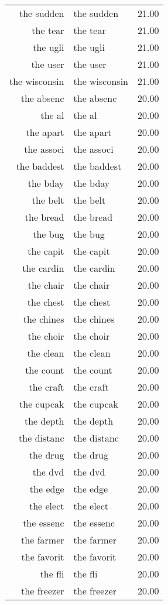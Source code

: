 \begin{table}[ht]
\begin{tabular}{rlr}
  the sudden & the sudden & 21.00 \\ 
  the tear & the tear & 21.00 \\ 
  the ugli & the ugli & 21.00 \\ 
  the user & the user & 21.00 \\ 
  the wisconsin & the wisconsin & 21.00 \\ 
  the absenc & the absenc & 20.00 \\ 
  the al & the al & 20.00 \\ 
  the apart & the apart & 20.00 \\ 
  the associ & the associ & 20.00 \\ 
  the baddest & the baddest & 20.00 \\ 
  the bday & the bday & 20.00 \\ 
  the belt & the belt & 20.00 \\ 
  the bread & the bread & 20.00 \\ 
  the bug & the bug & 20.00 \\ 
  the capit & the capit & 20.00 \\ 
  the cardin & the cardin & 20.00 \\ 
  the chair & the chair & 20.00 \\ 
  the chest & the chest & 20.00 \\ 
  the chines & the chines & 20.00 \\ 
  the choir & the choir & 20.00 \\ 
  the clean & the clean & 20.00 \\ 
  the count & the count & 20.00 \\ 
  the craft & the craft & 20.00 \\ 
  the cupcak & the cupcak & 20.00 \\ 
  the depth & the depth & 20.00 \\ 
  the distanc & the distanc & 20.00 \\ 
  the drug & the drug & 20.00 \\ 
  the dvd & the dvd & 20.00 \\ 
  the edge & the edge & 20.00 \\ 
  the elect & the elect & 20.00 \\ 
  the essenc & the essenc & 20.00 \\ 
  the farmer & the farmer & 20.00 \\ 
  the favorit & the favorit & 20.00 \\ 
  the fli & the fli & 20.00 \\ 
  the freezer & the freezer & 20.00 \\ 

\end{tabular}
\end{table}
